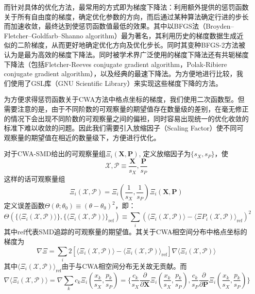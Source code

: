 而针对具体的优化方法，最常用的方式即为梯度下降法：利用额外提供的惩罚函数关于所有自由度的梯度，确定优化参数的方向，而后通过某种算法确定行进的步长而加速收敛，最终达到使惩罚函数值最低的效果。其中以BFGS法（Broyden–Fletcher–Goldfarb–Shanno algorithm）最为著名\cite{nazareth1979relationship}，其利用历史的梯度数据生成近似的二阶梯度，从而更好地确定优化方向及优化步长。同时其变种BFGS-2方法被认为是最为高效的梯度下降法\cite{galassi2002gnu}。同时被学术界广泛使用的梯度下降法还有共轭梯度下降法（包括Fletcher-Reeves conjugate gradient algorithm\cite{dai1996convergence}，Polak-Ribiere conjugate gradient algorithm\cite{klessig1972efficient}），以及经典的最速下降法\cite{curry1944method}。为方便地进行比较，我们使用了GSL库（GNU Scientific Library）来实现这些梯度下降的方法\cite{galassi2002gnu}。

为方便求得惩罚函数关于CWA方法中格点坐标的梯度，我们使用二次函数型。但需要注意的是，由于不同阶数的可观察量的期望值存在数量级的差别，在毫无修正的情况下会出现不同阶数的可观察量之间的偏袒，同时容易出现统一的优化收敛的标准下难以收敛的问题。因此我们需要引入放缩因子（Scaling Factor）使不同可观察量的期望值在相近的数量级下，方便进行优化。

对于CWA-SMD给出的可观察量组$\Xi_i(\boldsymbol{X},\boldsymbol{P})$, 定义放缩因子为$\{s_X,s_P\}$，使
\begin{equation}
    \mathcal{X}, \mathcal{P} \equiv \frac{\boldsymbol{X}}{s_X},\frac{\boldsymbol{P}}{s_P}
  \end{equation}
  这样的话可观察量组
  \begin{equation}
    \Xi_i(\mathcal{X},\mathcal{P}) = \Xi_i(\frac{1}{s_X},\frac{1}{s_P}) \Xi_i(\boldsymbol{X},\boldsymbol{P}) 
  \end{equation}
  定义误差函数$\Theta(\theta;\theta_0) \equiv (\theta-\theta_0)^2$，即：
  \begin{equation}
    \Theta(\{\langle \Xi_i(\mathcal{X},\mathcal{P}) \rangle \}, \{\langle \Xi_i(\mathcal{X},\mathcal{P}) \rangle \}_\mathrm{ref}) \equiv \sum_i (\langle \Xi_i(\mathcal{X},\mathcal{P}) \rangle- \langle \Xi P_i(\mathcal{X},\mathcal{P}) \rangle_\mathrm{ref})^2
  \end{equation}
其中$\mathrm{ref}$代表SMD追踪的可观察量的期望值。其关于CWA相空间分布中格点坐标的梯度为
\begin{equation}
  \nabla \Xi = \sum_i 2\left[\langle \Xi_i(\mathcal{X},\mathcal{P}) \rangle- \langle \Xi_i(\mathcal{X},\mathcal{P}) \rangle_\mathrm{ref} \right] \nabla\langle \Xi_i(\mathcal{X},\mathcal{P}) \rangle
\end{equation} 
其中$\langle \Xi_i(\mathcal{X},\mathcal{P}) \rangle_\mathrm{ref}$由于与CWA相空间分布无关故无贡献。而
\begin{equation}
  \nabla \langle \Xi_i(\mathcal{X}, \mathcal{P}) \rangle = \nabla \sum_{k} c_{k} \Xi_i (\frac{x_k}{s_X} ,\frac{p_k}{s_P}) =  \{ \frac{c_{k}}{s_X} \frac{\partial}{\partial \boldsymbol{X}} \Xi_i ( \frac{x_k}{s_X} ,\frac{p_k}{s_P}), \frac{c_{k}}{s_P} \frac{\partial}{\partial \boldsymbol{P}} \Xi_i (\frac{x_k}{s_X} ,\frac{p_k}{s_P}) \}
\end{equation} 

